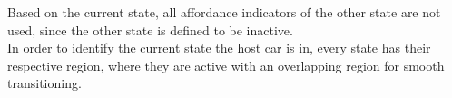 Based on the current state, all affordance indicators of the other state are not used, since the other state is defined to be inactive.\\
In order to identify the current state the host car is in, every state has their respective region, where they are active with an overlapping region for smooth transitioning.





